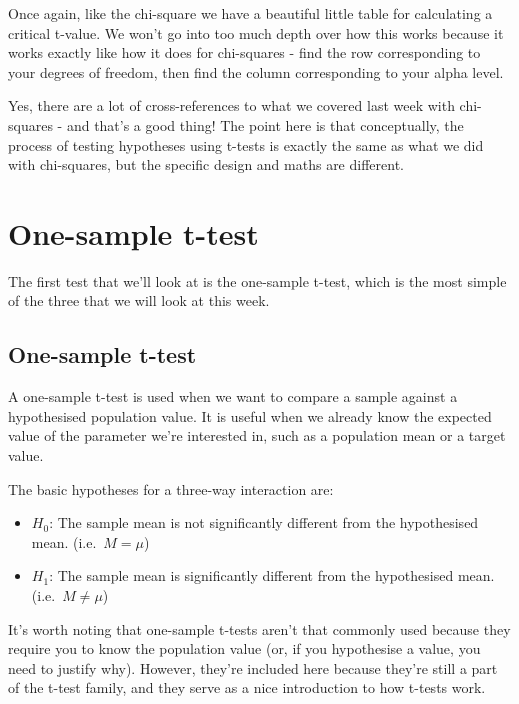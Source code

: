 \documentclass[
]{book}
\providecommand{\tightlist}{%
  \setlength{\itemsep}{0pt}\setlength{\parskip}{0pt}}
\begin{document}
Once again, like the chi-square we have a beautiful little table for calculating a critical t-value. We won't go into too much depth over how this works because it works exactly like how it does for chi-squares - find the row corresponding to your degrees of freedom, then find the column corresponding to your alpha level.

Yes, there are a lot of cross-references to what we covered last week with chi-squares - and that's a good thing! The point here is that conceptually, the process of testing hypotheses using t-tests is exactly the same as what we did with chi-squares, but the specific design and maths are different.

\hypertarget{one-sample-t-test}{%
\section{One-sample t-test}\label{one-sample-t-test}}

The first test that we'll look at is the one-sample t-test, which is the most simple of the three that we will look at this week.

\hypertarget{one-sample-t-test-1}{%
\subsection{One-sample t-test}\label{one-sample-t-test-1}}

A one-sample t-test is used when we want to compare a sample against a hypothesised population value. It is useful when we already know the expected value of the parameter we're interested in, such as a population mean or a target value.

The basic hypotheses for a three-way interaction are:

\begin{itemize}
\tightlist
\item
  \(H_0\): The sample mean is not significantly different from the hypothesised mean. (i.e.~\(M = \mu\))
\item
  \(H_1\): The sample mean is significantly different from the hypothesised mean. (i.e.~\(M \neq \mu\))
\end{itemize}

It's worth noting that one-sample t-tests aren't that commonly used because they require you to know the population value (or, if you hypothesise a value, you need to justify why). However, they're included here because they're still a part of the t-test family, and they serve as a nice introduction to how t-tests work.
\end{document}
